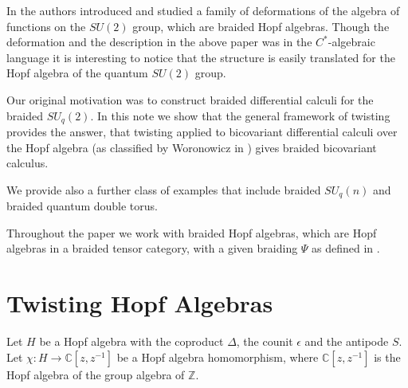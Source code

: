 \documentclass[12pt]{amsart}
\theoremstyle{definition}
\numberwithin{equation}{section}
\renewcommand{\a}{\chi}             %
\newcommand{\C}{\mathbb{C}}         %
\newcommand{\Z}{\mathbb{Z}}         %
\begin{document}
In \cite{KMRW14} the authors introduced and studied a family of deformations of the algebra of 
functions on the $SU(2)$ group, which are braided Hopf algebras. Though the deformation and the
description in the above paper was in the $C^\ast$-algebraic language it is interesting to notice 
that the structure is easily translated for the Hopf algebra of the quantum $SU(2)$ group. 

Our original motivation was to construct braided differential calculi for the braided $SU_q(2)$. 
In this note we show that the general framework of twisting provides the answer, that twisting
applied to bicovariant differential calculi over the Hopf algebra (as classified by Woronowicz in 
\cite{Wo89}) gives braided bicovariant calculus.

We provide also a further class of examples that include braided $SU_q(n)$ and braided quantum 
double torus.

Throughout the paper we work with braided Hopf algebras, which are Hopf algebras in a braided tensor 
category, with a given braiding $\Psi$ as defined in \cite{majid95}.
\section{Twisting Hopf Algebras}

Let $H$ be a Hopf algebra with the coproduct $\Delta$, the 
counit $\epsilon$ and the antipode $S$. Let $\a: H \to \C[z,z^{-1}]$ 
be a Hopf algebra homomorphism, where $\C[z,z^{-1}]$ is the
Hopf algebra of the group algebra of $\Z$. 
\end{document}
